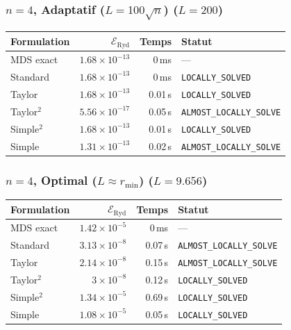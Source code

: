 \subsubsection{$n=4$, Adaptatif ($L{=}100\sqrt{n}$) ($L=200$)}
\begin{longtable}{@{}lrrl@{}}
  \toprule
  Formulation & $\mathcal{E}_{\mathrm{Ryd}}$ & Temps & Statut \\
  \midrule
  \endhead
  MDS exact & $1.68\times10^{-13}$ & 0\,ms & --- \\
  Standard & $1.68\times10^{-13}$ & 0\,ms & \texttt{LOCALLY\_SOLVED} \\
  Taylor & $1.68\times10^{-13}$ & 0.01\,s & \texttt{LOCALLY\_SOLVED} \\
  Taylor$^2$ & $5.56\times10^{-17}$ & 0.05\,s & \texttt{ALMOST\_LOCALLY\_SOLVE} \\
  Simple$^2$ & $1.68\times10^{-13}$ & 0.01\,s & \texttt{LOCALLY\_SOLVED} \\
  Simple & $1.31\times10^{-13}$ & 0.02\,s & \texttt{ALMOST\_LOCALLY\_SOLVE} \\
  \bottomrule
\end{longtable}

\subsubsection{$n=4$, Optimal ($L{\approx}r_{\min}$) ($L=9.656$)}
\begin{longtable}{@{}lrrl@{}}
  \toprule
  Formulation & $\mathcal{E}_{\mathrm{Ryd}}$ & Temps & Statut \\
  \midrule
  \endhead
  MDS exact & $1.42\times10^{-5}$ & 0\,ms & --- \\
  Standard & $3.13\times10^{-8}$ & 0.07\,s & \texttt{ALMOST\_LOCALLY\_SOLVE} \\
  Taylor & $2.14\times10^{-8}$ & 0.15\,s & \texttt{ALMOST\_LOCALLY\_SOLVE} \\
  Taylor$^2$ & $3\times10^{-8}$ & 0.12\,s & \texttt{LOCALLY\_SOLVED} \\
  Simple$^2$ & $1.34\times10^{-5}$ & 0.69\,s & \texttt{LOCALLY\_SOLVED} \\
  Simple & $1.08\times10^{-5}$ & 0.05\,s & \texttt{LOCALLY\_SOLVED} \\
  \bottomrule
\end{longtable}

